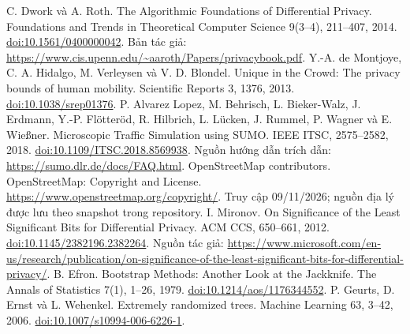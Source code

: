  C. Dwork và A. Roth. The Algorithmic Foundations of Differential Privacy. Foundations and Trends in Theoretical Computer Science 9(3--4), 211--407, 2014. \href{https://doi.org/10.1561/0400000042}{doi:10.1561/0400000042}. Bản tác giả: \url{https://www.cis.upenn.edu/~aaroth/Papers/privacybook.pdf}.
 Y.-A. de Montjoye, C. A. Hidalgo, M. Verleysen và V. D. Blondel. Unique in the Crowd: The privacy bounds of human mobility. Scientific Reports 3, 1376, 2013. \href{https://doi.org/10.1038/srep01376}{doi:10.1038/srep01376}.
 P. Alvarez Lopez, M. Behrisch, L. Bieker-Walz, J. Erdmann, Y.-P. Flötteröd, R. Hilbrich, L. Lücken, J. Rummel, P. Wagner và E. Wießner. Microscopic Traffic Simulation using SUMO. IEEE ITSC, 2575--2582, 2018. \href{https://doi.org/10.1109/ITSC.2018.8569938}{doi:10.1109/ITSC.2018.8569938}. Nguồn hướng dẫn trích dẫn: \url{https://sumo.dlr.de/docs/FAQ.html}.
 OpenStreetMap contributors. OpenStreetMap: Copyright and License. \url{https://www.openstreetmap.org/copyright/}. Truy cập 09/11/2026; nguồn địa lý được lưu theo snapshot trong repository.
 I. Mironov. On Significance of the Least Significant Bits for Differential Privacy. ACM CCS, 650--661, 2012. \href{https://doi.org/10.1145/2382196.2382264}{doi:10.1145/2382196.2382264}. Nguồn tác giả: \url{https://www.microsoft.com/en-us/research/publication/on-significance-of-the-least-significant-bits-for-differential-privacy/}.
 B. Efron. Bootstrap Methods: Another Look at the Jackknife. The Annals of Statistics 7(1), 1--26, 1979. \href{https://doi.org/10.1214/aos/1176344552}{doi:10.1214/aos/1176344552}.
 P. Geurts, D. Ernst và L. Wehenkel. Extremely randomized trees. Machine Learning 63, 3--42, 2006. \href{https://doi.org/10.1007/s10994-006-6226-1}{doi:10.1007/s10994-006-6226-1}.
